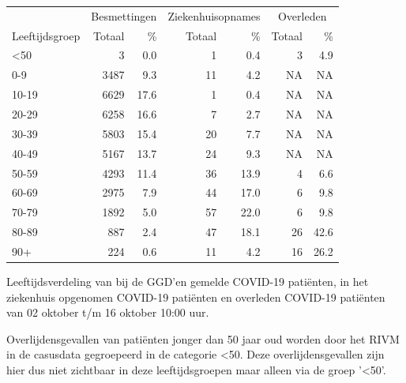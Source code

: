 \documentclass[
  english,
  man,floatsintext]{apa6}
\begin{document}
\begin{table}
\centering\begingroup\fontsize{11}{13}\selectfont

\begin{threeparttable}
\begin{tabular}{lrrrrrr}
\toprule
\multicolumn{1}{c}{ } & \multicolumn{2}{c}{Besmettingen} & \multicolumn{2}{c}{Ziekenhuisopnames} & \multicolumn{2}{c}{Overleden} \\
\cmidrule(l{3pt}r{3pt}){2-3} \cmidrule(l{3pt}r{3pt}){4-5} \cmidrule(l{3pt}r{3pt}){6-7}
Leeftijdsgroep & Totaal & \% & Totaal & \% & Totaal & \%\\
\midrule
<50 & 3 & 0.0 & 1 & 0.4 & 3 & 4.9\\
0-9 & 3487 & 9.3 & 11 & 4.2 & NA & NA\\
10-19 & 6629 & 17.6 & 1 & 0.4 & NA & NA\\
20-29 & 6258 & 16.6 & 7 & 2.7 & NA & NA\\
30-39 & 5803 & 15.4 & 20 & 7.7 & NA & NA\\
40-49 & 5167 & 13.7 & 24 & 9.3 & NA & NA\\
50-59 & 4293 & 11.4 & 36 & 13.9 & 4 & 6.6\\
60-69 & 2975 & 7.9 & 44 & 17.0 & 6 & 9.8\\
70-79 & 1892 & 5.0 & 57 & 22.0 & 6 & 9.8\\
80-89 & 887 & 2.4 & 47 & 18.1 & 26 & 42.6\\
90+ & 224 & 0.6 & 11 & 4.2 & 16 & 26.2\\
\bottomrule
\end{tabular}
\begin{tablenotes}
\item[1] Leeftijdsverdeling van bij de GGD’en gemelde COVID-19 patiënten, in het ziekenhuis opgenomen COVID-19 patiënten en overleden COVID-19 patiënten van 02 oktober t/m 16 oktober 10:00 uur.
\item[2] Overlijdensgevallen van patiënten jonger dan 50 jaar oud worden door het RIVM in de casusdata gegroepeerd in de categorie <50. Deze overlijdensgevallen zijn hier dus niet zichtbaar in deze leeftijdsgroepen maar alleen via de groep '<50'.
\end{tablenotes}
\end{threeparttable}
\endgroup{}
\end{table}

\newpage
\end{document}

